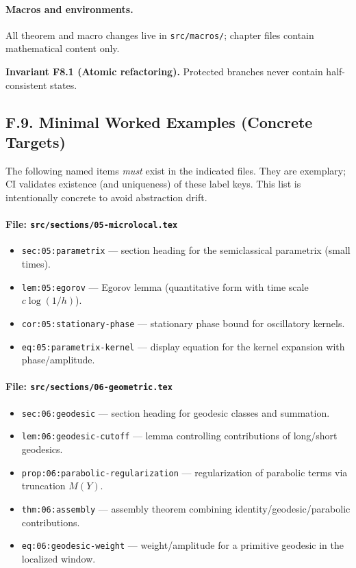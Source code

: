 \paragraph{Macros and environments.} All theorem and macro changes live in \texttt{src/macros/}; chapter files contain mathematical content only.

\noindent\textbf{Invariant F8.1 (Atomic refactoring).} Protected branches never contain half-consistent states.


\subsection*{F.9. Minimal Worked Examples (Concrete Targets)}

\noindent
The following named items \emph{must} exist in the indicated files. They are exemplary; CI validates existence
(and uniqueness) of these label keys. This list is intentionally concrete to avoid abstraction drift.

\paragraph{File: \texttt{src/sections/05-microlocal.tex}}
\begin{itemize}
  \item \texttt{sec:05:parametrix} — section heading for the semiclassical parametrix (small times).
  \item \texttt{lem:05:egorov} — Egorov lemma (quantitative form with time scale $c\log(1/h)$).
  \item \texttt{cor:05:stationary-phase} — stationary phase bound for oscillatory kernels.
  \item \texttt{eq:05:parametrix-kernel} — display equation for the kernel expansion with phase/amplitude.
\end{itemize}

\paragraph{File: \texttt{src/sections/06-geometric.tex}}
\begin{itemize}
  \item \texttt{sec:06:geodesic} — section heading for geodesic classes and summation.
  \item \texttt{lem:06:geodesic-cutoff} — lemma controlling contributions of long/short geodesics.
  \item \texttt{prop:06:parabolic-regularization} — regularization of parabolic terms via truncation $M(Y)$.
  \item \texttt{thm:06:assembly} — assembly theorem combining identity/geodesic/parabolic contributions.
  \item \texttt{eq:06:geodesic-weight} — weight/amplitude for a primitive geodesic in the localized window.
\end{itemize}

